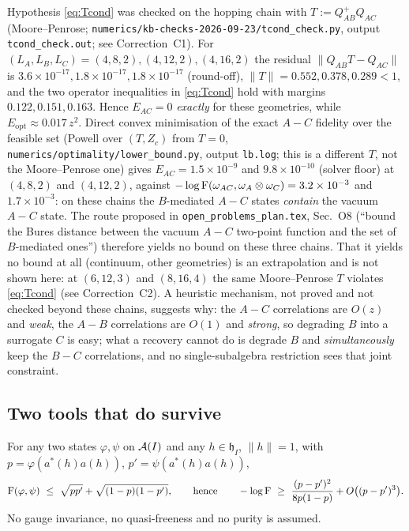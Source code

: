 \documentclass[11pt]{article}
\newcommand{\hh}{\mathfrak h}
\newcommand{\Erec}{E_{\mathrm{opt}}}
\begin{document}
\begin{verdictbreak}
Hypothesis \eqref{eq:Tcond} was checked on the hopping chain with
\(T:=Q_{AB}^{+}Q_{AC}\) (Moore--Penrose;
\texttt{numerics/kb-checks-2026-09-23/\allowbreak tcond\_check.py}, output \texttt{tcond\_check.out}; see Correction~C1).  For
\((L_A,L_B,L_C)=(4,8,2),(4,12,2),(4,16,2)\) the residual
\(\|Q_{AB}T-Q_{AC}\|\) is \(3.6\times10^{-17},1.8\times10^{-17},1.8\times10^{-17}\) (round-off),
\(\|T\|=0.552,0.378,0.289<1\), and the two operator inequalities in
\eqref{eq:Tcond} hold with margins \(0.122,0.151,0.163\).  Hence \(E_{AC}=0\)
\emph{exactly} for these geometries, while \(\Erec\approx0.017\,z^2\).  Direct
convex minimisation of the exact \(A\!-\!C\) fidelity over the feasible set (Powell over \((T,Z_c)\) from \(T=0\), \texttt{numerics/optimality/\allowbreak lower\_bound.py}, output \texttt{lb.log}; this is a different \(T\), not the Moore--Penrose one) gives
\(E_{AC}=1.5\times10^{-9}\) and \(9.8\times10^{-10}\) (solver floor) at
\((4,8,2)\) and \((4,12,2)\), against
\(-\log\operatorname{F}(\omega_{AC},\omega_A\otimes\omega_C)=3.2\times10^{-3}\) and
\(1.7\times10^{-3}\): on these chains the \(B\)-mediated \(A\!-\!C\) states \emph{contain} the
vacuum \(A\!-\!C\) state.  The route proposed in \texttt{open\_problems\_plan.tex},
Sec.~O8 (``bound the Bures distance between the vacuum \(A\!-\!C\) two-point
function and the set of \(B\)-mediated ones'') therefore yields no bound on these three chains.  That it yields no bound at all (continuum, other geometries) is an extrapolation and is not shown here: at \((6,12,3)\) and \((8,16,4)\) the same Moore--Penrose \(T\) violates \eqref{eq:Tcond} (see Correction~C2).
A heuristic mechanism, not proved and not checked beyond these chains, suggests why: the \(A\!-\!C\) correlations are \(O(z)\) and
\emph{weak}, the \(A\!-\!B\) correlations are \(O(1)\) and \emph{strong}, so
degrading \(B\) into a surrogate \(C\) is easy; what a recovery cannot do is
degrade \(B\) and \emph{simultaneously} keep the \(B\!-\!C\) correlations, and no
single-subalgebra restriction sees that joint constraint.
\end{verdictbreak}

\subsection{Two tools that do survive}

\begin{lemma}\label{lem:onemode}
For any two states \(\varphi,\psi\) on \(\mathcal A(I)\) and any \(h\in\hh_I\),
\(\|h\|=1\), with \(p=\varphi(a^*(h)a(h))\), \(p'=\psi(a^*(h)a(h))\),
\begin{equation}\label{eq:onemode}
 \operatorname{F}(\varphi,\psi)\ \le\ \sqrt{pp'}+\sqrt{(1-p)(1-p')},
 \qquad\text{hence}\qquad
 -\log\operatorname{F}\ \ge\ \frac{(p-p')^2}{8p(1-p)}+O\bigl((p-p')^3\bigr).
\end{equation}
No gauge invariance, no quasi-freeness and no purity is assumed.
\end{lemma}
\end{document}
